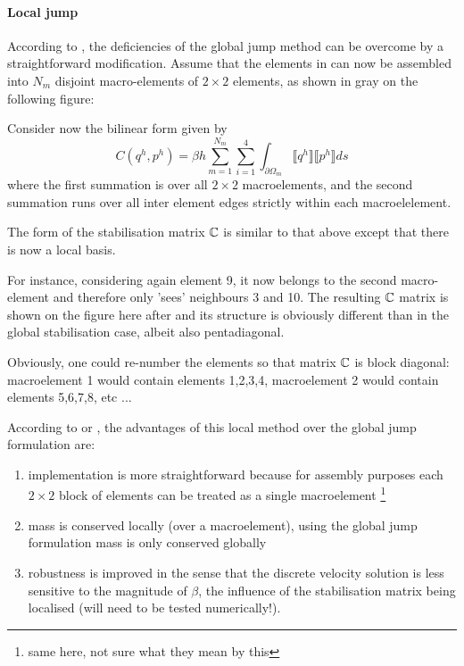 \vspace{.5cm}

\paragraph{Local jump}

According to \textcite{sike90}, the deficiencies of the global jump method can be overcome by a straightforward modification. Assume that the elements in can now be assembled into $N_m$ disjoint macro-elements
of $2\times 2$ elements, as shown in gray on the following figure:

\begin{center}

\end{center}

Consider now the bilinear form given by
\[
C(q^h,p^h) = \beta h \sum_{m=1}^{N_m} \sum_{i=1}^4 \int_{\partial \Omega_m} \llbracket q^h \rrbracket  \llbracket p^h \rrbracket ds
\]
where the first summation is over all $2\times 2$ macroelements,
and the second summation runs over all inter element edges strictly within each macroelelement.

The form of the stabilisation matrix ${\mathbb{C}}$ is similar to that above except that there is now a local basis.

For instance, considering again element 9, it now belongs to the second macro-element and therefore only 'sees' neighbours 3 and 10.
The resulting ${\mathbb{C}}$ matrix is shown on the figure here after and
its structure is obviously different than in the global stabilisation case, albeit also pentadiagonal.

\begin{center}

\end{center}

\begin{remark}
Obviously, one could re-number the elements so that matrix ${\mathbb{C}}$
is block diagonal: macroelement 1 would contain elements 1,2,3,4, macroelement 2 would contain elements 5,6,7,8, etc ... 
\end{remark}

According to \textcite{sike90} or \textcite{chke20}, the advantages of this local method over the global jump
formulation are:
\begin{enumerate}
\item implementation is more straightforward because for assembly purposes each $2\times 2$ block of elements can be treated as a single macroelement \footnote{same here, not sure what they mean by this}
\item mass is conserved locally (over a macroelement), using the global jump formulation mass is only conserved globally
\item robustness is improved in the sense that the discrete velocity solution is less sensitive to the magnitude of $\beta$, the influence of the stabilisation matrix being localised (will need to be tested numerically!). 
\end{enumerate}

